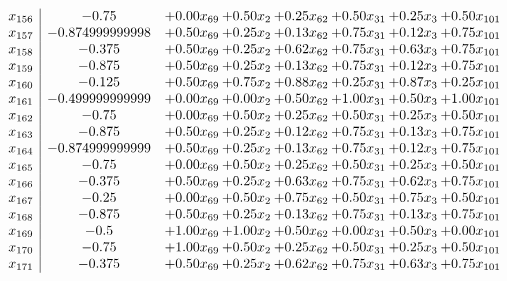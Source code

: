 \documentclass[8pt]{article}
\begin{document}
\[\begin{array}{c| c c@{\hskip 2pt} c@{\hskip 2pt} c@{\hskip 2pt} c@{\hskip 2pt} c@{\hskip 2pt} c@{\hskip 2pt} }
 x_{156}   &  -0.75 & +  0.00 x_{69} & +  0.50 x_{2} & +  0.25 x_{62} & +  0.50 x_{31} & +  0.25 x_{3} & +  0.50 x_{101}\\
 x_{157}   &  -0.874999999998 & +  0.50 x_{69} & +  0.25 x_{2} & +  0.13 x_{62} & +  0.75 x_{31} & +  0.12 x_{3} & +  0.75 x_{101}\\
 x_{158}   &  -0.375 & +  0.50 x_{69} & +  0.25 x_{2} & +  0.62 x_{62} & +  0.75 x_{31} & +  0.63 x_{3} & +  0.75 x_{101}\\
 x_{159}   &  -0.875 & +  0.50 x_{69} & +  0.25 x_{2} & +  0.13 x_{62} & +  0.75 x_{31} & +  0.12 x_{3} & +  0.75 x_{101}\\
 x_{160}   &  -0.125 & +  0.50 x_{69} & +  0.75 x_{2} & +  0.88 x_{62} & +  0.25 x_{31} & +  0.87 x_{3} & +  0.25 x_{101}\\
 x_{161}   &  -0.499999999999 & +  0.00 x_{69} & +  0.00 x_{2} & +  0.50 x_{62} & +  1.00 x_{31} & +  0.50 x_{3} & +  1.00 x_{101}\\
 x_{162}   &  -0.75 & +  0.00 x_{69} & +  0.50 x_{2} & +  0.25 x_{62} & +  0.50 x_{31} & +  0.25 x_{3} & +  0.50 x_{101}\\
 x_{163}   &  -0.875 & +  0.50 x_{69} & +  0.25 x_{2} & +  0.12 x_{62} & +  0.75 x_{31} & +  0.13 x_{3} & +  0.75 x_{101}\\
 x_{164}   &  -0.874999999999 & +  0.50 x_{69} & +  0.25 x_{2} & +  0.13 x_{62} & +  0.75 x_{31} & +  0.12 x_{3} & +  0.75 x_{101}\\
 x_{165}   &  -0.75 & +  0.00 x_{69} & +  0.50 x_{2} & +  0.25 x_{62} & +  0.50 x_{31} & +  0.25 x_{3} & +  0.50 x_{101}\\
 x_{166}   &  -0.375 & +  0.50 x_{69} & +  0.25 x_{2} & +  0.63 x_{62} & +  0.75 x_{31} & +  0.62 x_{3} & +  0.75 x_{101}\\
 x_{167}   &  -0.25 & +  0.00 x_{69} & +  0.50 x_{2} & +  0.75 x_{62} & +  0.50 x_{31} & +  0.75 x_{3} & +  0.50 x_{101}\\
 x_{168}   &  -0.875 & +  0.50 x_{69} & +  0.25 x_{2} & +  0.13 x_{62} & +  0.75 x_{31} & +  0.13 x_{3} & +  0.75 x_{101}\\
 x_{169}   &  -0.5 & +  1.00 x_{69} & +  1.00 x_{2} & +  0.50 x_{62} & +  0.00 x_{31} & +  0.50 x_{3} & +  0.00 x_{101}\\
 x_{170}   &  -0.75 & +  1.00 x_{69} & +  0.50 x_{2} & +  0.25 x_{62} & +  0.50 x_{31} & +  0.25 x_{3} & +  0.50 x_{101}\\
 x_{171}   &  -0.375 & +  0.50 x_{69} & +  0.25 x_{2} & +  0.62 x_{62} & +  0.75 x_{31} & +  0.63 x_{3} & +  0.75 x_{101}\\

\end{array}\]
\end{document}
